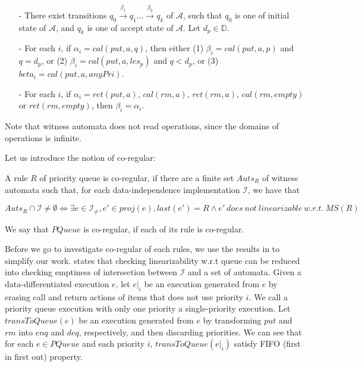 \begin{itemize}
\setlength{\itemsep}{0.5pt}
\item[-] There exist transitions $q_0 \xrightarrow{\beta_1} q_1 \ldots \xrightarrow{\beta_k} q_k$ of $\mathcal{A}$, such that $q_0$ is one of initial state of $\mathcal{A}$, and $q_k$ is one of accept state of $\mathcal{A}$. Let $d_p \in \mathbb{D}$.

\item[-] For each $i$, if $\alpha_i = \textit{cal}(\textit{put},a,q)$, then either (1) $\beta_i = \textit{cal}(\textit{put},a,p)$ and $q = d_p$, or (2) $\beta_i = \textit{cal}(\textit{put},a,\textit{les}_p)$ and $q < d_p$, or (3) $beta_i = \textit{cal}(\textit{put},a,\textit{anyPri})$.

\item[-] For each $i$, if $\alpha_i = \textit{ret}(\textit{put},a)$, $\textit{cal}(\textit{rm},a)$, $\textit{ret}(\textit{rm},a)$, $\textit{cal}(\textit{rm},\textit{empty})$ or $\textit{ret}(\textit{rm},\textit{empty})$, then $\beta_i = \alpha_i$.
\end{itemize}

Note that witness automata does not read operations, since the domains of operations is infinite.

Let us introduce the notion of co-regular:

\begin{definition}\label{def:co-regular of rules of priority queues}
A rule $R$ of priority queue is co-regular, if there are a finite set $\textit{Auts}_{R}$ of witness automata such that, for each data-independence implementation $\mathcal{I}$, we have that

$$ \textit{Auts}_{R} \cap \mathcal{I} \neq \emptyset \Leftrightarrow \exists e \in \mathcal{I}_{\neq},e' \in \textit{proj}(e), last(e')=R \wedge e' \ does \ not \ linearizable \ w.r.t. \ \textit{MS}(R)$$

We say that $\textit{PQueue}$ is co-regular, if each of its rule is co-regular.
\end{definition}

Before we go to investigate co-regular of each rules, we use the results in \cite{Bouajjani:2015} to simplify our work. \cite{Bouajjani:2015} states that checking linearizability w.r.t queue can be reduced into checking emptiness of intersection between $\mathcal{I}$ and a set of automata. Given a data-differentiated execution $e$, let $e \vert_{i}$ be an execution generated from $e$ by erasing call and return actions of items that does not use priority $i$. We call a priority queue execution with only one priority a single-priority execution. Let $\textit{transToQueue}(e)$ be an execution generated from $e$ by transforming $\textit{put}$ and $\textit{rm}$ into $\textit{enq}$ and $\textit{deq}$, respectively, and then discarding priorities. We can see that for each $e \in \textit{PQueue}$ and each priority $i$, $\textit{transToQueue}(e \vert_{i})$ satisfy FIFO (first in first out) property.

